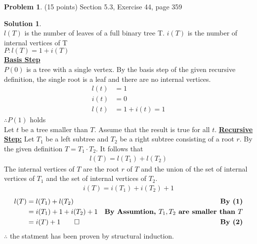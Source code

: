 \documentclass{article}
\theoremstyle{definition}
\newtheorem{problem}{Problem}
\newtheorem*{solution}{Solution}
\begin{document}
\begin{problem} (15 points)
Section 5.3, Exercise 44, page 359
\end{problem}
\begin{solution} \ \\
$l(T)$ is the number of leaves of a full binary tree T.
$i(T )$ is the number of internal vertices of T \\
$P: l(T) = 1 + i(T)$ \\
\textbf{\underline{Basis Step}} \\
$P(0)$ is a tree with a single vertex. By the basis step of the given recursive definition, the single root is a leaf and there are no internal vertices.
\begin{align*}
  l(t) &= 1 \\
  i(t) &= 0 \\
  l(t) &= 1 + i(t) = 1
\end{align*}
$\therefore P(1)$ holds \\
Let $t$ be a tree smaller than $T$. Assume that the result is true for all $t$.
\textbf{\underline{Recursive Step:}}
Let $T_1$ be a left subtree and $T_2$ be a right subtree consisting of a root $r$. By the given definition $T = T_1 \cdot T_2$. It follows that
\begin{eqnarray}
  l(T) = l(T_1) + l(T_2)
\end{eqnarray}
The internal vertices of $T$ are the root $r$ of $T$ and the union of the
set of internal vertices of $T_1$ and the set of internal vertices
of $T_2$.
\begin{eqnarray}
  i(T) = i(T_1) + i(T_2) + 1
\end{eqnarray}
\begin{align*}
  l(T) &= l(T_1) + l(T_2) &\textbf{By (1)}\\
  &= i(T_1) + 1 + i(T_2) + 1 &\textbf{By Assumtion, $T_1,T_2$ are smaller than $T$}\\
  &= i(T) + 1 \qed &\textbf{By (2)}
\end{align*}
$\therefore$ the statment has been proven by structural induction.
\end{solution}
\end{document}
